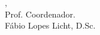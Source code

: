 \begin{folhadeaprovacao}
\begin{table}[h]
\begin{tabular}{cr}
    \end{tabular}
    \vspace*{1cm}
    \end{table}


   \begin{center}
    \vspace*{0.5cm}
    {\large\imprimirlocal}, {\large\imprimirdata} \\
    \vspace*{1cm}
    Prof. Coordenador. \\
    Fábio Lopes Licht, D.Sc.
  \end{center}
  
\end{folhadeaprovacao}
